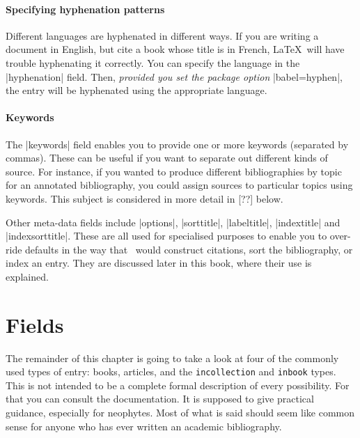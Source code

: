 {\paragraph{Specifying hyphenation patterns}Different languages are hyphenated in different ways. If you are writing a document in English, but cite a book whose title is in French, \LaTeX\ will have trouble hyphenating it correctly. You can specify the language in the |hyphenation| field. Then, \emph{provided you set the package option} |babel=hyphen|, the entry will be hyphenated using the appropriate language.

\paragraph{Keywords} The |keywords| field enables you to provide one or more keywords (separated by commas). These can be useful if you want to separate out different kinds of source. For instance, if you wanted to produce different bibliographies by topic for an annotated bibliography, you could assign sources to particular topics using keywords. This subject is considered in more detail in [??] below.

Other meta-data fields include |options|, |sorttitle|, |labeltitle|, |indextitle| and |indexsorttitle|. These are all used for specialised purposes to enable you to over-ride defaults in the way that \biblatex\ would construct citations, sort the bibliography, or index an entry. They are discussed later in this book, where their use is explained.


\section{Fields}

The remainder of this chapter is going to take a look at four of the commonly used types of entry: books, articles, and the \verb|incollection| and \verb|inbook| types. This is not intended to be a complete formal description of every possibility. For that you can consult the documentation. It is supposed to give practical guidance, especially for neophytes. Most of what is said should seem like common sense for anyone who has ever written an academic bibliography.

}
